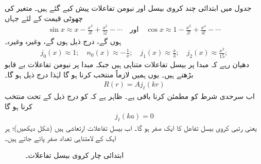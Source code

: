 جدول  میں ابتدائی چند کروی بیسل اور نیومن تفاعلات پیش کیے گئے ہیں۔ متغیر  کی چھوٹی قیمت کے لئے جہاں
\begin{align*}
\sin x\approx x-\frac{x^{3}}{3!}+\frac{x^{5}}{5!}-\dotsb\quad \text{اور}\quad  \cos x \approx 1-\frac{x^{2}}{2!}+\frac{x^{4}}{4!}-\dotsb
\end{align*}
 ہوں گے، درج ذیل ہوں گے، وغیرہ وغیرہ۔
\begin{align*}
j_{0}(x)\approx1;\quad{n_{0}(x)\approx-\frac{1}{x}};\quad{j_{1}(x)\approx\frac{x}{3}};\quad{j_{2}(x)\approx\frac{x^{2}}{15}}; 
\end{align*}
 دھیان رہے کہ مبدا  پر بیسل تفاعلات متناہی  ہیں جبکہ مبدا پر نیومن تفاعلات بے قابو بڑھتے ہیں۔ یوں ہمیں لازماً   منتخب کرنا ہو گا لہٰذا درج ذیل ہو گا۔
\begin{align}
R(r)=Aj_{\ell}(kr) 
\end{align}
اب سرحدی شرط  کو مطمئن کرنا باقی ہے۔ ظاہر ہے کہ  کو درج ذیل کے تحت منتخب کرنا ہو گا
\begin{align}
j_{\ell}(ka)=0
\end{align}
یعنی  رتبی کروی بیسل تفاعل کا  ایک صفر ہو گا۔ اب بیسل تفاعلات ارتعاشی ہیں (شکل   دیکھیں)؛ ہر ایک کے لامتناہی تعداد  صفر پائے جاتے ہیں۔
\begin{figure}
\centering
{}
\caption{ابتدائی چار کروی بیسل تفاعلات۔}
\label{شکل_تین_ابعادی_چار_کروی_بیسل_تفاعلات}
\end{figure}




